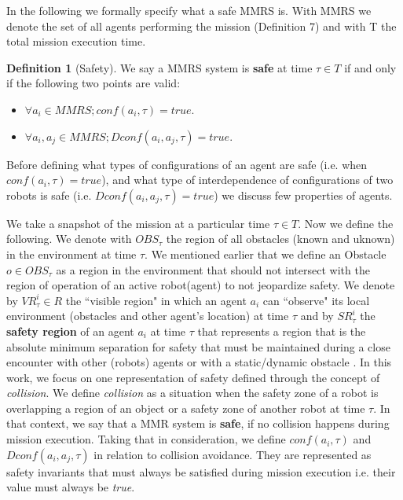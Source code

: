 \documentclass[journal]{IEEEtran}
\theoremstyle{definition}
\newtheorem{definition}{Definition}
\begin{document}
In the following we formally specify what a safe MMRS is. With MMRS we denote the set of all agents performing the mission (Definition 7) and with T the total mission execution time. 

\begin{definition}[Safety]
We say a MMRS system is \textbf{safe} at time $\tau \in T$ if and only if the following two points are valid:
\begin{itemize}
\item  $\forall a_i \in MMRS; conf(a_i, \tau)=true$.
 \item  $\forall a_i,a_j \in MMRS; Dconf(a_i, a_j,\tau)=true$.
\end{itemize}
\end{definition}

Before defining what types of configurations of an agent are safe (i.e. when $conf(a_i, \tau)=true$), and what type of interdependence of configurations of two robots is safe (i.e. $Dconf(a_i, a_j,\tau)=true$) we discuss few properties of agents.

We take a snapshot of the mission at a particular time $\tau \in T$. Now we define the following.
We denote with $OBS_\tau$ the region of all obstacles (known and uknown) in the environment at time $\tau$. We mentioned earlier that we define an Obstacle $o \in OBS_\tau$ as a region in the environment that should not intersect with the region of operation of an active robot(agent) to not jeopardize safety. 
We denote by $VR_\tau^i \in R $ the ``visible region" in which an agent $a_i$ can ``observe" its local environment (obstacles and other agent's location) at time $\tau$ and by $SR_\tau^i$ the \textbf{safety region} of an agent $a_i$  at time $\tau$ that represents a region that is the  absolute  minimum  separation  for  safety that must  be  maintained  during  a close  encounter  with  other (robots) agents  or with  a static/dynamic obstacle . 
In this work, we focus on one representation of safety defined through the concept of \textit{collision}. We define \textit{collision} as a situation when the safety zone of a robot is overlapping a region of an object or a safety zone of another robot at time $\tau$. In that context, we say that a MMR system is \textbf{safe}, if no collision happens during mission execution. Taking that in consideration, we define $conf(a_i, \tau)$ and $Dconf(a_i, a_j,\tau)$ in relation to collision avoidance. They are represented as safety invariants that must always be satisfied during mission execution  i.e. their value must always be \textit{true}.
\end{document}
